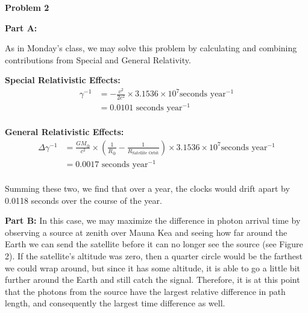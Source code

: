 \documentclass[12pt]{article}
\begin{document}
\begin{onehalfspacing}

\raggedright{\textbf{\Large Problem 2}}\\
\raggedright{\textbf{\large Part A: }}

As in Monday's class, we may solve this problem by calculating and combining contributions from Special and General Relativity.

\bigskip

\textbf{Special Relativistic Effects:}
\begin{align*}
  \gamma^{-1} &= - \frac{v^2}{2 c^2} \times 3.1536 \times 10^7 \text{seconds year$^{-1}$}\\
              &= 0.0101 \text{ seconds year$^{-1}$}\\
\end{align*}


\textbf{General Relativistic Effects:}
\begin{align*}
  \Delta \gamma^{-1} &= \frac{G M_{\oplus}}{c^2} \times \left( \frac{1}{R_{\oplus}} - \frac{1}{R_{\text{Satellite Orbit}}} \right)  \times 3.1536 \times 10^7 \text{seconds year$^{-1}$}\\
                     &= 0.0017  \text{ seconds year$^{-1}$} \\
\end{align*}


Summing these two, we find that over a year, the clocks would drift apart by 0.0118 seconds over the course of the year.

\bigskip
\bigskip

\raggedright{\textbf{\large Part B: }}
In this case, we may maximize the difference in photon arrival time by observing a source at zenith over Mauna Kea and seeing how far around the Earth we can send the satellite before it can no longer see the source (see Figure 2). If the satellite's altitude was zero, then a quarter circle would be the farthest we could wrap around, but since it has some altitude, it is able to go a little bit further around the Earth and still catch the signal. Therefore, it is at this point that the photons from the source have the largest relative difference in path length, and consequently the largest time difference as well. \bigskip


\end{onehalfspacing}
\end{document}
